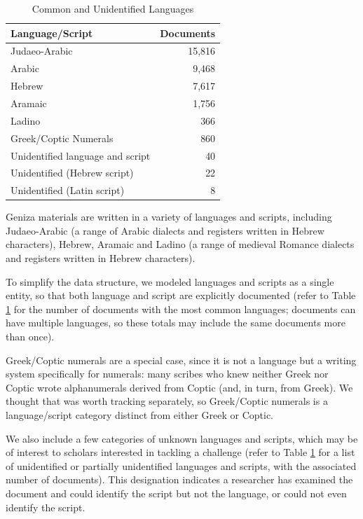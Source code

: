 \documentclass{article}
\begin{document}
\begin{table}
\caption{Common and Unidentified Languages}
\label{table:langs_docs}
\begin{tabular}{lr}
\toprule
Language/Script & Documents \\
\midrule
Judaeo-Arabic & 15,816 \\
Arabic & 9,468 \\
Hebrew & 7,617 \\
Aramaic & 1,756 \\
Ladino & 366 \\
Greek/Coptic Numerals & 860 \\
\midrule
Unidentified language and script & 40 \\
Unidentified (Hebrew script) & 22 \\
Unidentified (Latin script) & 8 \\
\bottomrule
\end{tabular}
\end{table}

Geniza materials are written in a variety of languages and scripts, including Judaeo-Arabic (a range of Arabic dialects and registers written in Hebrew characters), Hebrew, Aramaic and Ladino (a range of medieval Romance dialects and registers written in Hebrew characters).

To simplify the data structure, we modeled languages and scripts as a single entity, so that both language and script are explicitly documented (refer to Table \ref{table:langs_docs} for the number of documents with the most common languages; documents can have multiple languages, so these totals may include the same documents more than once). 

Greek/Coptic numerals are a special case, since it is not a language but a writing system specifically for numerals: many scribes who knew neither Greek nor Coptic wrote alphanumerals derived from Coptic (and, in turn, from Greek). We thought that was worth tracking separately, so Greek/Coptic numerals is a language/script category distinct from either Greek or Coptic.

We also include a few categories of unknown languages and scripts, which may be of interest to scholars interested in tackling a challenge (refer to Table \ref{table:langs_docs} for a list of unidentified or partially unidentified languages and scripts, with the associated number of documents). This designation indicates a researcher has examined the document and could identify the script but not the language, or could not even identify the script.
\end{document}
